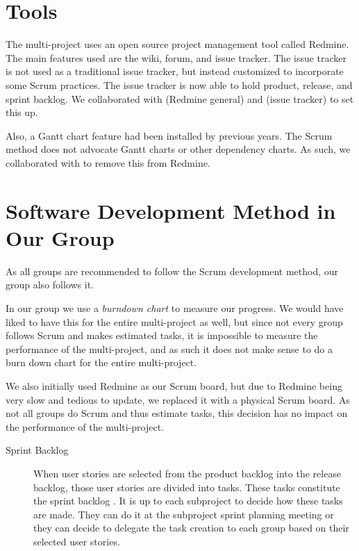 \section{Tools}\label{sec:redmine}
The multi-project uses an open source project management tool called Redmine. The main features used are the wiki, forum, and issue tracker. The issue tracker is not used as a traditional issue tracker, but instead customized to incorporate some Scrum practices. The issue tracker is now able to hold product, release, and sprint backlog. We collaborated with  (Redmine general) and  (issue tracker) to set this up. 

Also, a Gantt chart feature had been installed by previous years. The Scrum method does not advocate Gantt charts or other dependency charts. As such, we collaborated with  to remove this from Redmine.

\section{Software Development Method in Our Group}
As all groups are recommended to follow the Scrum development method, our group also follows it. 

In our group we use a \emph{burndown chart} to measure our progress. We would have liked to have this for the entire multi-project as well, but since not every group follows Scrum and makes estimated tasks, it is impossible to measure the performance of the multi-project, and as such it does not make sense to do a burn down chart for the entire multi-project.

We also initially used Redmine as our Scrum board, but due to Redmine being very slow and tedious to update, we replaced it with a physical Scrum board. As not all groups do Scrum and thus estimate tasks, this decision has no impact on the performance of the multi-project.

\begin{description}
  \item[Sprint Backlog] When user stories are selected from the product backlog into the release backlog, those user stories are divided into tasks. These tasks constitute the sprint backlog \parencite{larman2003}. It is up to each subproject to decide how these tasks are made. They can do it at the subproject sprint planning meeting or they can decide to delegate the task creation to each group based on their selected user stories. 
\end{description}


